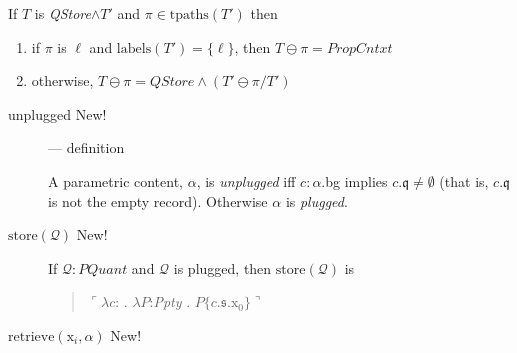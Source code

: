 \begin{description}
If $T$ is \textit{QStore}$\wedge T'$ and
  $\pi\in\mathrm{tpaths}(T')$ then
  \begin{enumerate}
    
  \item if $\pi$ is $\ell$ and $\mathrm{labels}(T')=\{\ell\}$, then $T\ominus\pi=\textit{PropCntxt}$
    
  \item otherwise, $T\ominus\pi= \textit{QStore}\wedge(T'\ominus \pi/T')$
  \end{enumerate}

  \begin{description}
\item[unplugged New!] --- definition

  A parametric content, $\alpha$, is \textit{unplugged} iff $c:\alpha$.bg implies $c.\mathfrak{q}\not=\emptyset$
(that is, $c.\mathfrak{q}$ is not the empty record).  Otherwise $\alpha$
is \textit{plugged}.

\item[\textnormal{$\mathrm{store}(\mathcal{Q})$} New!] \mbox{}

  If $\mathcal{Q}:\textit{PQuant}$ and $\mathcal{Q}$ is plugged, then
$\mathrm{store}(\mathcal{Q})$ is
\begin{quote}
  $\ulcorner\lambda c$: . $\lambda
  P$:\textit{Ppty} . $P\{c.\mathfrak{s}.\text{x}_0\}\urcorner$
\end{quote}

\item[\textnormal{$\mathrm{retrieve}(\text{x}_i,\alpha)$} New!]
  \mbox{}


\end{description}
\end{description}
